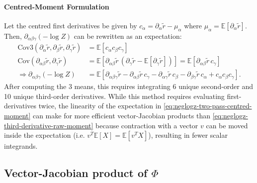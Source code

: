 \documentclass{article}
\begin{document}
\paragraph{Centred-Moment Formulation}

Let the centred first derivatives be given by $c_{\alpha} = \partial_{\alpha} \tilde{r} - \mu_{\alpha}$ where $\mu_{\alpha} = \mathbb{E}[\partial_{\alpha} \tilde{r}]$.
Then, $\partial_{\alpha\beta\gamma}(-\log Z)$ can be rewritten as an expectation:
%
\begin{align}
  \mathrm{Cov3}(\partial_{\alpha} \tilde{r}, \partial_{\beta} \tilde{r}, \partial_{\gamma} \tilde{r}) & = \mathbb{E}[c_{\alpha} c_{\beta} c_{\gamma}]                                                                                                                                                                                                                                            \\
  \mathrm{Cov}(\partial_{\alpha\beta} \tilde{r}, \partial_{\gamma} \tilde{r})                         & = \mathbb{E}[\partial_{\alpha\beta} \tilde{r} \, (\partial_{\gamma} \tilde{r} - \mathbb{E}[\partial_{\gamma} \tilde{r}])] = \mathbb{E}[\partial_{\alpha\beta} \tilde{r} \, c_{\gamma}]                                                                                                   \\
  \Rightarrow \partial_{\alpha\beta\gamma} (-\log Z)                                                  & = \mathbb{E} [ \partial_{\alpha\beta\gamma} \tilde{r} - \partial_{\alpha\beta} \tilde{r} \, c_{\gamma} - \partial_{\alpha\gamma} \tilde{r} \, c_{\beta} - \partial_{\beta\gamma} \tilde{r} \, c_{\alpha} + c_{\alpha} c_{\beta} c_{\gamma} ]. \label{eq:neglogz-two-pass-centred-moment}
\end{align}
%
After computing the 3 means, this requires integrating 6 unique second-order and 10 unique third-order derivatives.
While this method requires evaluating first-derivatives twice, the linearity of the expectation in \cref{eq:neglogz-two-pass-centred-moment} can make for more efficient vector-Jacobian products than \cref{eq:neglogz-third-derivative-raw-moment} because contraction with a vector $v$ can be moved inside the expectation (i.e. $v^T \mathbb{E}[X] = \mathbb{E}[v^T X]$), resulting in fewer scalar integrands.

\subsection{Vector-Jacobian product of $\Phi$}
\end{document}
